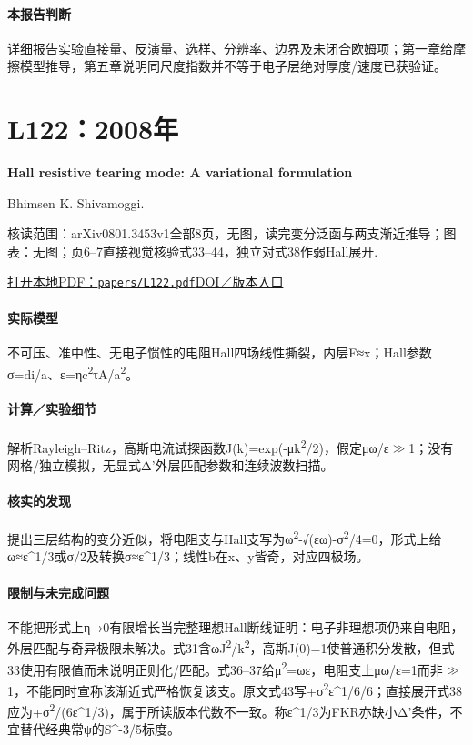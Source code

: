 \paragraph{本报告判断}详细报告实验直接量、反演量、选样、分辨率、边界及未闭合欧姆项；第一章给摩擦模型推导，第五章说明同尺度指数并不等于电子层绝对厚度/速度已获验证。

\section{L122：2008年}\label{paper:L122}

\textbf{Hall resistive tearing mode: A variational formulation}\citep{L122}\

Bhimsen K. Shivamoggi.

\textsf{核读范围：}arXiv0801.3453v1全部8页，无图，读完变分泛函与两支渐近推导；\textsf{图表：}无图；页6–7直接视觉核验式33–44，独立对式38作弱Hall展开.

\href{run:papers/L122.pdf}{打开本地PDF：\texttt{papers/L122.pdf}}\quad\href{https://doi.org/10.1209/0295-5075/83/55002}{DOI／版本入口}

\paragraph{实际模型}不可压、准中性、无电子惯性的电阻Hall四场线性撕裂，内层F≈x；Hall参数σ=di/a、ε=ηc\textsuperscript{2}τA/a\textsuperscript{2}。

\paragraph{计算／实验细节}解析Rayleigh–Ritz，高斯电流试探函数J(k)=exp(-μk\textsuperscript{2}/2)，假定μω/ε\ensuremath{\gg}1；没有网格/独立模拟，无显式Δ'外层匹配参数和连续波数扫描。

\paragraph{核实的发现}提出三层结构的变分近似，将电阻支与Hall支写为ω\textsuperscript{2}-√(εω)-σ\textsuperscript{2}/4=0，形式上给ω≈ε\textasciicircum{}1/3或σ/2及转换σ≈ε\textasciicircum{}1/3；线性b在x、y皆奇，对应四极场。

\paragraph{限制与未完成问题}不能把形式上η→0有限增长当完整理想Hall断线证明：电子非理想项仍来自电阻，外层匹配与奇异极限未解决。式31含ωJ\textsuperscript{2}/k\textsuperscript{2}，高斯J(0)=1使普通积分发散，但式33使用有限值而未说明正则化/匹配。式36–37给μ\textsuperscript{2}=ωε，电阻支上μω/ε=1而非\ensuremath{\gg}1，不能同时宣称该渐近式严格恢复该支。原文式43写+σ\textsuperscript{2}ε\textasciicircum{}1/6/6；直接展开式38应为+σ\textsuperscript{2}/(6ε\textasciicircum{}1/3)，属于所读版本代数不一致。称ε\textasciicircum{}1/3为FKR亦缺小Δ'条件，不宜替代经典常ψ的S\textasciicircum{}-3/5标度。

